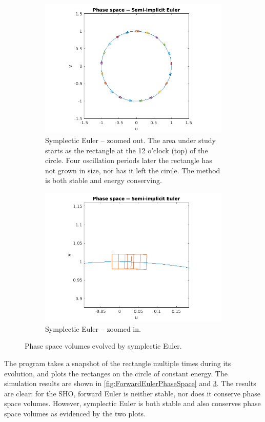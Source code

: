 \documentclass[hidelinks,notitlepage]{book}
\begin{document}
\begin{figure}[t!]
	\begin{subfigure}[t]{0.5\columnwidth}
		\centering
		\includegraphics[width=1.1\linewidth]{SymplecticEulerPhaseSpace_ZoomOut.png}
		\caption{Symplectic Euler -- zoomed out. The area under study starts as the rectangle at the 12 o'clock (top) of the circle.  Four oscillation periods later the rectangle has not grown in size, nor has it left the circle.  The method is both stable and energy conserving. }
		\label{fig:SymplecticEulerPhaseSpace_ZoomOut}
	\end{subfigure}
	\begin{subfigure}[t]{0.5\columnwidth}
		\centering
		\includegraphics[width=1.1\linewidth]{SymplecticEulerPhaseSpace_ZoomIn.png}
		\caption{Symplectic Euler -- zoomed in.}
		\label{fig:SymplecticEulerPhaseSpace_ZoomIn}
	\end{subfigure}
	\caption{Phase space volumes evolved by symplectic Euler.}
	\label{fig:SymplecticEulerPhaseSpace}
\end{figure}
The program takes a snapshot of the rectangle multiple times during its evolution, and plots the rectanges on the circle of constant energy.  The simulation results are shown in \cref{fig:ForwardEulerPhaseSpace} and \cref{fig:SymplecticEulerPhaseSpace}.  The results are clear: for the SHO, forward Euler is neither stable, nor does it conserve phase space volumes.   However, symplectic Euler is both stable and also conserves phase space volumes as evidenced by the two plots.
\end{document}

